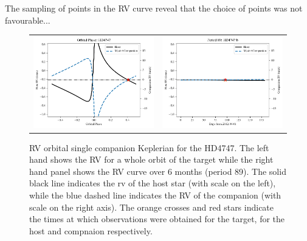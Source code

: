 The sampling of points in the RV curve reveal that the choice of points was not favourable...


\begin{figure}
    \centering
    \begin{tabular}{cc}
    \includegraphics[width=0.45\linewidth]{figures/direct-recovery/orbital-plots/HD4747_orbital_phase.pdf}& \includegraphics[width=0.45\linewidth]{figures/direct-recovery/orbital-plots/HD4747_p89.pdf}\\
    \end{tabular}
    \caption{RV orbital single companion Keplerian for the HD4747. The left hand shows the RV for a whole orbit of the target while the right hand panel shows the RV curve over 6 months (period 89). The solid black line indicates the rv of the host star (with scale on the left), while the blue dashed line indicates the RV of the companion (with scale on the right axis).  The orange crosses and red stars indicate the times at which observations were obtained for the target, for the host and compnaion respectively.}
    \label{fig:hd4747p89}
\end{figure}

